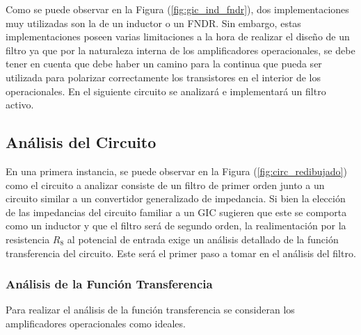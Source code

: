 
Como se puede observar en la Figura (\ref{fig:gic_ind_fndr}), dos implementaciones muy utilizadas son la de un inductor o un FNDR. Sin embargo, estas implementaciones poseen varias limitaciones a la hora de realizar el diseño de un filtro ya que por la naturaleza interna de los amplificadores operacionales, se debe tener en cuenta que debe haber un camino para la continua que pueda ser utilizada para polarizar correctamente los transistores en el interior de los operacionales. En el siguiente circuito se analizará e implementará un filtro activo.


\subsection{Análisis del Circuito}

En una primera instancia, se puede observar en la Figura (\ref{fig:circ_redibujado}) como el circuito a analizar consiste de un filtro de primer orden junto a un circuito similar a un convertidor generalizado de impedancia. Si bien la elección de las impedancias del circuito familiar a un GIC sugieren que este se comporta como un inductor y que el filtro será de segundo orden, la realimentación por la resistencia $R_8$ al potencial de entrada exige un análisis detallado de la función transferencia del circuito. Este será el primer paso a tomar en el análisis del filtro.

\subsubsection{Análisis de la Función Transferencia}
\label{sec:fun_trans}
Para realizar el análisis de la función transferencia se consideran los amplificadores operacionales como ideales.

